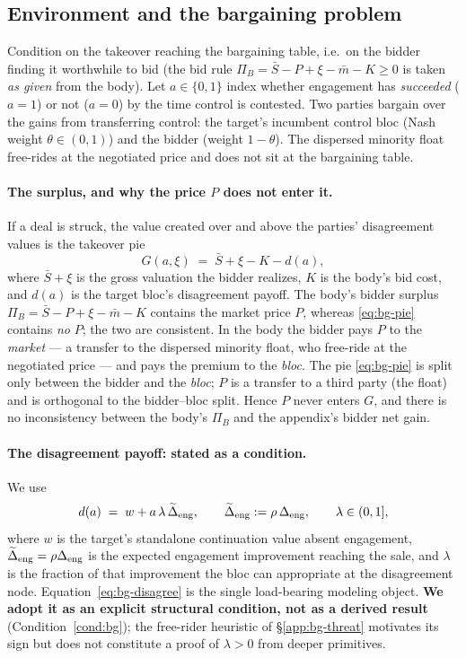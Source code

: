 \documentclass[11pt]{article}
\newcommand{\1}{\mathbf{1}}
\begin{document}
\subsection{Environment and the bargaining problem}
\label{app:bg-env}

Condition on the takeover reaching the bargaining table, i.e.\ on the bidder finding it worthwhile to bid (the bid rule $\Pi_{B}=\bar S-P+\xi-\bar m-K\ge 0$ is taken \emph{as given} from the body). Let $a\in\{0,1\}$ index whether engagement has \emph{succeeded} ($a=1$) or not ($a=0$) by the time control is contested. Two parties bargain over the gains from transferring control: the target's incumbent control bloc (Nash weight $\theta\in(0,1)$) and the bidder (weight $1-\theta$). The dispersed minority float free-rides at the negotiated price and does not sit at the bargaining table.

\paragraph{The surplus, and why the price $P$ does not enter it.}
If a deal is struck, the value created over and above the parties' disagreement values is the takeover pie
\begin{equation}
  \label{eq:bg-pie}
  G(a,\xi)\;=\;\bar S+\xi-K-d(a),
\end{equation}
where $\bar S+\xi$ is the gross valuation the bidder realizes, $K$ is the body's bid cost, and $d(a)$ is the target bloc's disagreement payoff. The body's bidder surplus $\Pi_{B}=\bar S-P+\xi-\bar m-K$ contains the market price $P$, whereas \eqref{eq:bg-pie} contains \emph{no} $P$; the two are consistent. In the body the bidder pays $P$ to the \emph{market} --- a transfer to the dispersed minority float, who free-ride at the negotiated price --- and pays the premium to the \emph{bloc}. The pie \eqref{eq:bg-pie} is split only between the bidder and the \emph{bloc}; $P$ is a transfer to a third party (the float) and is orthogonal to the bidder--bloc split. Hence $P$ never enters $G$, and there is no inconsistency between the body's $\Pi_{B}$ and the appendix's bidder net gain.

\paragraph{The disagreement payoff: stated as a condition.}
We use
\begin{equation}
  \label{eq:bg-disagree}
  d(a)\;=\;w+a\,\lambda\,\widetilde{\Delta}_{\mathrm{eng}},
  \qquad \widetilde{\Delta}_{\mathrm{eng}}:=\rho\,\Delta_{\mathrm{eng}},
  \qquad \lambda\in(0,1],
\end{equation}
where $w$ is the target's standalone continuation value absent engagement, $\widetilde{\Delta}_{\mathrm{eng}}=\rho\Delta_{\mathrm{eng}}$ is the expected engagement improvement reaching the sale, and $\lambda$ is the fraction of that improvement the bloc can appropriate at the disagreement node. Equation~\eqref{eq:bg-disagree} is the single load-bearing modeling object. \textbf{We adopt it as an explicit structural condition, not as a derived result} (Condition~\ref{cond:bg}); the free-rider heuristic of \S\ref{app:bg-threat} motivates its sign but does not constitute a proof of $\lambda>0$ from deeper primitives.
\end{document}
